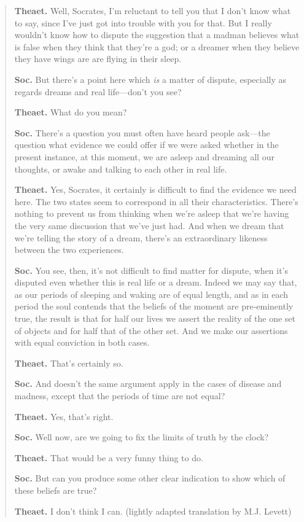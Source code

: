 \begin{quote}
\textbf{Theaet.} Well, Socrates, I'm reluctant to tell you that I don't know what to say, since I've just got into trouble with you for that. But I really wouldn't know how to dispute the suggestion that a madman believes what is false when they think that they're a god; or a dreamer when they believe they have wings are are flying in their sleep.

\textbf{Soc.} But there's a point here which \textit{is} a matter of dispute, especially as regards dreams and real life---don't you see?

\textbf{Theaet.} What do you mean?

\textbf{Soc.} There's a question you must often have heard people ask---the question what evidence we could offer if we were asked whether in the present instance, at this moment, we are asleep and dreaming all our thoughts, or awake and talking to each other in real life.

\textbf{Theaet.} Yes, Socrates, it certainly is difficult to find the evidence we need here. The two states seem to correspond in all their characteristics. There's nothing to prevent us from thinking when we're asleep that we're having the very same discussion that we've just had. And when we dream that we're telling the story of a dream, there's an extraordinary likeness between the two experiences.

\textbf{Soc.} You see, then, it's not difficult to find matter for dispute, when it's disputed even whether this is real life or a dream. Indeed we may say that, as our periods of sleeping and waking are of equal length, and as in each period the soul contends that the beliefs of the moment are pre-eminently true, the result is that for half our lives we assert the reality of the one set of objects and for half that of the other set. And we make our assertions with equal conviction in both cases.

\textbf{Theaet.} That's certainly so.

\textbf{Soc.} And doesn't the same argument apply in the cases of disease and madness, except that the periods of time are not equal?

\textbf{Theaet.} Yes, that's right.

\textbf{Soc.} Well now, are we going to fix the limits of truth by the clock?

\textbf{Theaet.} That would be a very funny thing to do.

\textbf{Soc.} But can you produce some other clear indication to show which of these beliefs are true?

\textbf{Theaet.} I don't think I can. (lightly adapted translation by M.J. Levett)
\end{quote}

